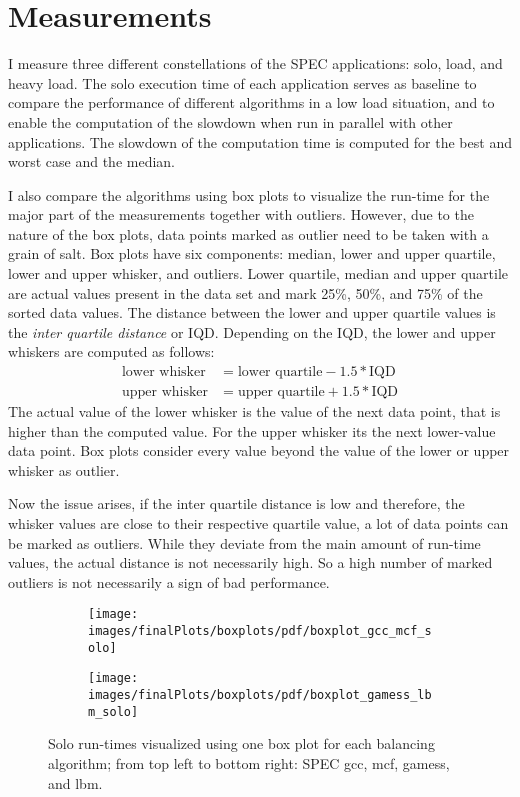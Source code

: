 \section{Measurements}
\label{eval:measurements}

I measure three different constellations of the SPEC applications: solo, load,
and heavy load.
The solo execution time of each application serves as baseline to compare the
performance of different algorithms in a low load situation, and to enable the
computation of the slowdown when run in parallel with other applications.
The slowdown of the computation time is computed for the best and worst
case and the median.

I also compare the algorithms using box plots to visualize
the run-time for the major part of the measurements together with outliers.
However, due to the nature of the box plots, data points marked as outlier need
to be taken with a grain of salt.
Box plots have six components: median, lower and upper quartile, lower and
upper whisker, and outliers.
Lower quartile, median and upper quartile are actual values present in the data
set and mark 25\%, 50\%, and 75\% of the sorted data values.
The distance between the lower and upper quartile values is the \emph{inter
quartile distance} or IQD.
Depending on the IQD, the lower and upper whiskers are computed as follows:
%
\begin{align*}
  \text{lower whisker} &= \text{lower quartile} - 1.5 * \text{IQD}\\
  \text{upper whisker} &= \text{upper quartile} + 1.5 * \text{IQD}
\end{align*}
%
The actual value of the lower whisker is the value of the next data point,
that is higher than the computed value.
For the upper whisker its the next lower-value data point.
Box plots consider every value beyond the value of the lower or upper whisker
as outlier.

Now the issue arises, if the inter quartile distance is low and therefore,
the whisker values are close to their respective quartile value, a lot of
data points can be marked as outliers.
While they deviate from the main amount of run-time values, the actual distance
is not necessarily high.
So a high number of marked outliers is not necessarily a sign of bad performance.


\begin{figure}[!ht]
  \begin{subfigure}{\textwidth}
  \texttt{[image: images/finalPlots/boxplots/pdf/boxplot\_gcc\_mcf\_solo]}
  \end{subfigure}
  \begin{subfigure}{\textwidth}
  \texttt{[image: images/finalPlots/boxplots/pdf/boxplot\_gamess\_lbm\_solo]}
  \end{subfigure}
  \caption{Solo run-times visualized using one box plot for each balancing
    algorithm; from top left to bottom right: SPEC gcc, mcf, gamess, and lbm.}
    \label{eval:fig:box_solo}
\end{figure}


